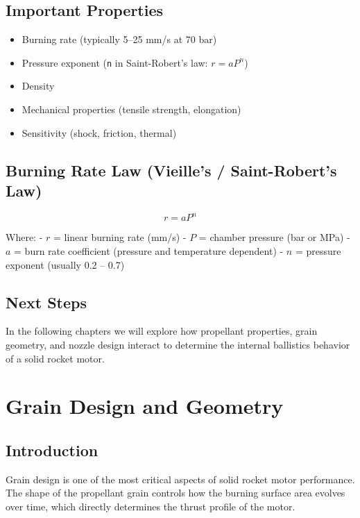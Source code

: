 \documentclass[
  letterpaper,
  DIV=11,
  numbers=noendperiod]{scrreprt}
\providecommand{\tightlist}{%
  \setlength{\itemsep}{0pt}\setlength{\parskip}{0pt}}
\begin{document}
\section{Important Properties}\label{important-properties}

\begin{itemize}
\tightlist
\item
  Burning rate (typically 5--25 mm/s at 70 bar)
\item
  Pressure exponent (\texttt{n} in Saint-Robert's law: \(r = a P^n\))
\item
  Density
\item
  Mechanical properties (tensile strength, elongation)
\item
  Sensitivity (shock, friction, thermal)
\end{itemize}

\section{Burning Rate Law (Vieille's / Saint-Robert's
Law)}\label{burning-rate-law-vieilles-saint-roberts-law}

\[
r = a P^n
\]

Where: - \(r\) = linear burning rate (mm/s) - \(P\) = chamber pressure
(bar or MPa) - \(a\) = burn rate coefficient (pressure and temperature
dependent) - \(n\) = pressure exponent (usually 0.2 -- 0.7)

\section{Next Steps}\label{next-steps}

In the following chapters we will explore how propellant properties,
grain geometry, and nozzle design interact to determine the internal
ballistics behavior of a solid rocket motor.


\chapter{Grain Design and Geometry}\label{grain-design-and-geometry}

\section{Introduction}\label{introduction-1}

Grain design is one of the most critical aspects of solid rocket motor
performance. The shape of the propellant grain controls how the burning
surface area evolves over time, which directly determines the thrust
profile of the motor.
\end{document}
